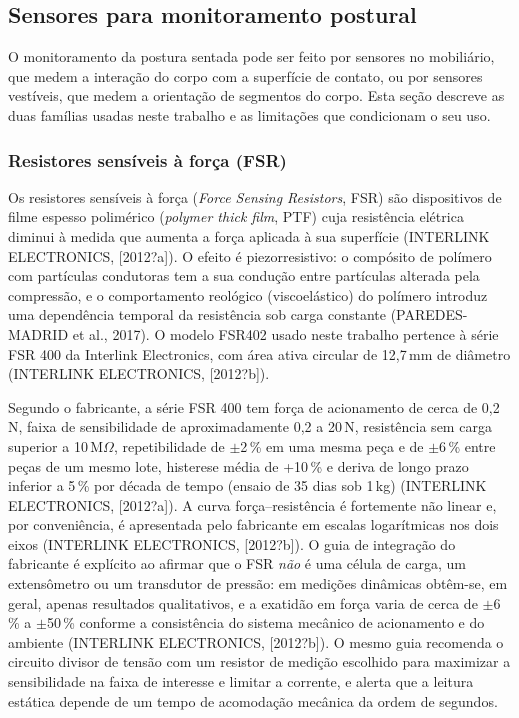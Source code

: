 \subsection{Sensores para monitoramento postural}
\label{sec:rev-sensores}

O monitoramento da postura sentada pode ser feito por sensores no mobiliário, que
medem a interação do corpo com a superfície de contato, ou por sensores vestíveis,
que medem a orientação de segmentos do corpo. Esta seção descreve as duas famílias
usadas neste trabalho e as limitações que condicionam o seu uso.

\subsubsection{Resistores sensíveis à força (FSR)}
\label{sec:rev-fsr}

Os resistores sensíveis à força (\emph{Force Sensing Resistors}, FSR) são
dispositivos de filme espesso polimérico (\emph{polymer thick film}, PTF) cuja
resistência elétrica diminui à medida que aumenta a força aplicada à sua superfície
(INTERLINK ELECTRONICS, [2012?a]). O efeito é piezorresistivo: o compósito de
polímero com partículas condutoras tem a sua condução entre partículas alterada
pela compressão, e o comportamento reológico (viscoelástico) do polímero introduz
uma dependência temporal da resistência sob carga constante (PAREDES-MADRID et al.,
2017). O modelo FSR402 usado neste trabalho pertence à série FSR 400 da Interlink
Electronics, com área ativa circular de 12{,}7\,mm de diâmetro (INTERLINK
ELECTRONICS, [2012?b]).

Segundo o fabricante, a série FSR 400 tem força de acionamento de cerca de
0{,}2\,N, faixa de sensibilidade de aproximadamente 0{,}2 a 20\,N, resistência sem
carga superior a 10\,M$\Omega$, repetibilidade de $\pm$2\,\% em uma mesma peça e de
$\pm$6\,\% entre peças de um mesmo lote, histerese média de +10\,\% e deriva de
longo prazo inferior a 5\,\% por década de tempo (ensaio de 35 dias sob 1\,kg)
(INTERLINK ELECTRONICS, [2012?a]). A curva força--resistência é fortemente não
linear e, por conveniência, é apresentada pelo fabricante em escalas logarítmicas
nos dois eixos (INTERLINK ELECTRONICS, [2012?b]). O guia
de integração do fabricante é explícito ao afirmar que o FSR \emph{não} é uma
célula de carga, um extensômetro ou um transdutor de pressão: em medições dinâmicas
obtêm-se, em geral, apenas resultados qualitativos, e a exatidão em força varia de
cerca de $\pm$6\,\% a $\pm$50\,\% conforme a consistência do sistema mecânico de
acionamento e do ambiente (INTERLINK ELECTRONICS, [2012?b]). O mesmo guia recomenda
o circuito divisor de tensão com um resistor de medição escolhido para maximizar a
sensibilidade na faixa de interesse e limitar a corrente, e alerta que a leitura
estática depende de um tempo de acomodação mecânica da ordem de segundos.

